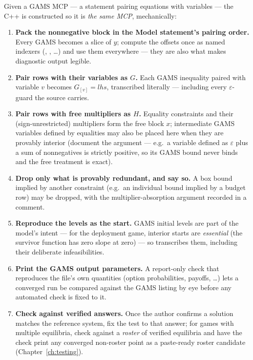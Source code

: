 Given a GAMS MCP --- a  statement pairing equations with
variables --- the C++  is constructed so it is \emph{the same
MCP}, mechanically:

\begin{enumerate}
\item \textbf{Pack the nonnegative block in the Model statement's pairing
  order.} Every GAMS  becomes a slice of $y$;
  compute the offsets once as named  indexers
  (, , \ldots) and use them everywhere
  --- they are also what makes diagnostic output legible.
\item \textbf{Pair  rows with their variables as $G$.} Each GAMS
  inequality  paired with variable $v$ becomes
  $G_{[v]} = \mathit{lhs}$, transcribed literally --- including every
  $\varepsilon$-guard the source carries.
\item \textbf{Pair  rows with free multipliers as $H$.} Equality
  constraints and their (sign-unrestricted) multipliers form the free block
  $x$; intermediate GAMS variables defined by equalities may also be placed
  here when they are provably interior (document the argument --- e.g.\ a
  variable defined as $\varepsilon$ plus a sum of nonnegatives is strictly
  positive, so its GAMS  bound never binds and the free
  treatment is exact).
\item \textbf{Drop only what is provably redundant, and say so.} A box bound
  implied by another constraint (e.g.\ an individual bound implied by a
  budget row) may be dropped, with the multiplier-absorption argument
  recorded in a comment.
\item \textbf{Reproduce the  levels as the start.} GAMS initial
  levels are part of the model's intent --- for the deployment game,
  interior starts are \emph{essential} (the survivor function has zero slope
  at zero) --- so  transcribes them, including their
  deliberate infeasibilities.
\item \textbf{Print the GAMS output parameters.} A report-only check that
  reproduces the  file's own  quantities (option
  probabilities, payoffs, \ldots) lets a converged run be compared against
  the GAMS listing by eye before any automated check is fixed to it.
\item \textbf{Check against verified answers.} Once the author confirms a
  solution matches the reference system, fix the test to that answer; for
  games with multiple equilibria, check against a \emph{roster} of verified
  equilibria and have the check print any converged non-roster point as a
  paste-ready roster candidate (Chapter~\ref{ch:testing}).
\end{enumerate}

